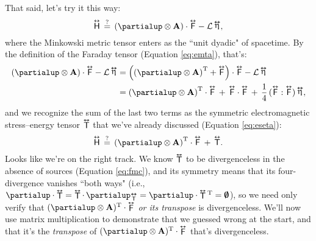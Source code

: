 \documentclass[12pt]{article}
\renewcommand{\vv}[1]{\mathbf{#1}}
\newcommand{\tightoverset}[2]{%
  \mathop{#2}\limits^{\vbox to -.5ex{\kern-0.75ex\hbox{$#1$}\vss}}}
\newcommand{\inlinedy}[1]{\tightoverset{\text{\tiny$\bm\leftrightarrow$}}{#1}}
\newcommand{\fnoverset}[2]{%
  \mathop{#2}\limits^{\vbox to -.5ex{\kern-0.85ex\hbox{$#1$}\vss}}}
\newcommand{\footnotedy}[1]{\fnoverset{\text{\tiny$\bm\leftrightarrow$}}{#1}}
\newcommand{\capdy}[1]{ \overset{ \text{\tiny$\bm\leftrightarrow$} }{\vphantom{\text{\small{A}}}\smash{#1}} }
\begin{document}
That said, let's try it this way:
\begin{equation*}
\capdy{\mathsf{H}} \, \stackrel{?}{=} \, \left( \partialup \otimes \vv A \right) \cdot \capdy{\mathsf{F}} - \mathcal{L} \inlinedy{\upeta} ,
\end{equation*}
where the Minkowski metric tensor enters as the ``unit dyadic" of spacetime. By the definition of the Faraday tensor (Equation \ref{eq:emta}), that's:
\begin{equation*}
\begin{split}
\left( \partialup \otimes \vv A \right) \cdot \capdy{\mathsf{F}} - \mathcal{L} \inlinedy{\upeta} &=  \left( \left( \partialup \otimes \vv A \right)^\mathrm{T} + \capdy{\mathsf{F}} \right) \cdot \capdy{\mathsf{F}} - \mathcal{L} \inlinedy{\upeta} \\
&= \left( \partialup \otimes \vv A \right)^\mathrm{T} \cdot \capdy{\mathsf{F}} \, + \, \capdy{\mathsf{F}} \cdot \capdy{\mathsf{F}} \, + \, \dfrac{1}{4} \, ( \capdy{\mathsf{F}} : \capdy{\mathsf{F}} ) \inlinedy{\upeta},
\end{split}
\end{equation*}
and we recognize the sum of the last two terms as the symmetric electromagnetic stress--energy tensor $\inlinedy{\mathsf{T}}$ that we've already discussed (Equation \ref{eq:eseta}):
\begin{equation*}
\capdy{\mathsf{H}} \, \stackrel{?}{=} \, \left( \partialup \otimes \vv A \right)^\mathrm{T} \cdot \capdy{\mathsf{F}} \, + \, \capdy{\mathsf{T}} .
\end{equation*}
Looks like we're on the right track. We know $\inlinedy{\mathsf{T}}$ to be divergenceless in the absence of sources (Equation \ref{eq:fmc}), and its symmetry means that its four-divergence vanishes ``both ways" (i.e., ${\partialup \cdot \inlinedy{\mathsf{T}} = \inlinedy{\mathsf{T}} \cdot \, \partialup _{\footnotedy{\mathsf{T}}} = \partialup \cdot \inlinedy{\mathsf{T}} {}^{\mathrm{T}} = \textrm{\mbox{\boldmath $\emptyset$}}}$), so we need only verify that $( \partialup \otimes \vv A )^\mathrm{T} \cdot \inlinedy{\mathsf{F}}$ \emph{or its transpose} is divergenceless. We'll now use matrix multiplication to demonstrate that we guessed wrong at the start, and that it's the \emph{transpose} of $( \partialup \otimes \vv A )^\mathrm{T} \cdot \inlinedy{\mathsf{F}}$ that's divergenceless.
\end{document}
